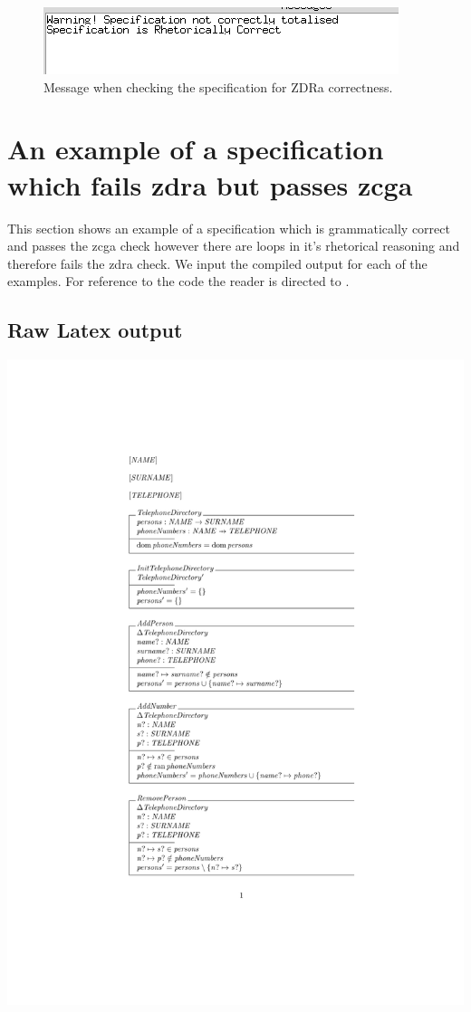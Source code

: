 \begin{figure}[H]
\includegraphics[scale=0.7]{examples/nonworkzcga/correct.png}
\caption{Message when checking the specification for ZDRa correctness.}
\end{figure}

\section{An example of a specification which fails \gls{zdra} but passes \gls{zcga}}
\label{app:failzdra}
This section shows an example of a specification which is grammatically correct and passes the \gls{zcga} check however there are loops in it's rhetorical reasoning and therefore fails the \gls{zdra} check. We input the compiled output for each of the examples. For reference to the code the reader is directed to \cite{mathlangexamples}.


\subsection{Raw Latex output}

\noindent \includegraphics[clip, trim=4cm 5.5cm 4cm 4.2cm, scale=0.9]{examples/nonworkzdra/0.pdf}

